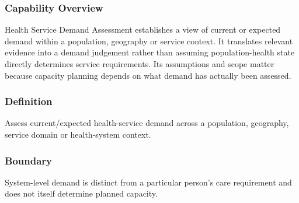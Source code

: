 \subsubsection*{Capability Overview}

Health Service Demand Assessment establishes a view of current or expected demand within a population, geography or service context. It translates relevant evidence into a demand judgement rather than assuming population-health state directly determines service requirements. Its assumptions and scope matter because capacity planning depends on what demand has actually been assessed.

\subsubsection*{Definition}

Assess current/\allowbreak{}expected health-service demand across a population, geography, service domain or health-system context.

\subsubsection*{Boundary}

System-level demand is distinct from a particular person's care requirement and does not itself determine planned capacity.

